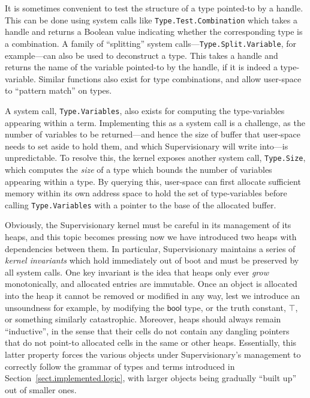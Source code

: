 \documentclass[a4paper, UKenglish, cleveref, autoref, thm-restate, colorlinks]{lipics-v2021}
\begin{document}
It is sometimes convenient to test the structure of a type pointed-to by a handle.
This can be done using system calls like \texttt{Type.Test.Combination} which takes a handle and returns a Boolean value indicating whether the corresponding type is a combination.
A family of ``splitting'' system calls---\texttt{Type.Split.Variable}, for example---can also be used to deconstruct a type.
This takes a handle and returns the name of the variable pointed-to by the handle, if it is indeed a type-variable.
Similar functions also exist for type combinations, and allow user-space to ``pattern match'' on types.

A system call, \texttt{Type.Variables}, also exists for computing the type-variables appearing within a term.
Implementing this as a system call is a challenge, as the number of variables to be returned---and hence the size of buffer that user-space needs to set aside to hold them, and which Supervisionary will write into---is unpredictable.
To resolve this, the kernel exposes another system call, \texttt{Type.Size}, which computes the \emph{size} of a type which bounds the number of variables appearing within a type.
By querying this, user-space can first allocate sufficient memory within its own address space to hold the set of type-variables before calling \texttt{Type.Variables} with a pointer to the base of the allocated buffer.

Obviously, the Supervisionary kernel must be careful in its management of its heaps, and this topic becomes pressing now we have introduced two heaps with dependencies between them.
In particular, Supervisionary maintains a series of \emph{kernel invariants} which hold immediately out of boot and must be preserved by all system calls.
One key invariant is the idea that heaps only ever \emph{grow} monotonically, and allocated entries are immutable.
Once an object is allocated into the heap it cannot be removed or modified in any way, lest we introduce an unsoundness for example, by modifying the $\mathsf{bool}$ type, or the truth constant, $\top$, or something similarly catastrophic.
Moreover, heaps should always remain ``inductive'', in the sense that their cells do not contain any dangling pointers that do not point-to allocated cells in the same or other heaps.
Essentially, this latter property forces the various objects under Supervisionary's management to correctly follow the grammar of types and terms introduced in Section~\ref{sect.implemented.logic}, with larger objects being gradually ``built up'' out of smaller ones.
\end{document}
